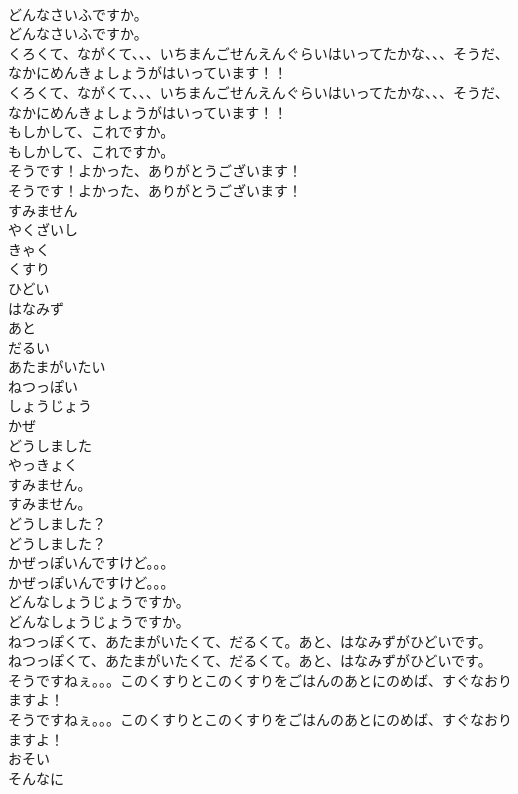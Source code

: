\documentclass[8pt]{extreport}
\begin{document}
\begin{CJK}{UTF8}{min}
\\	どんなさいふですか。	
\\	どんなさいふですか。 
\\	くろくて、ながくて、、、いちまんごせんえんぐらいはいってたかな、、、そうだ、なかにめんきょしょうがはいっています！！	
\\	くろくて、ながくて、、、いちまんごせんえんぐらいはいってたかな、、、そうだ、なかにめんきょしょうがはいっています！！ 
\\	もしかして、これですか。	
\\	もしかして、これですか。 
\\	そうです！よかった、ありがとうございます！	
\\	そうです！よかった、ありがとうございます！ 
\\	すみません
\\	やくざいし
\\	きゃく
\\	くすり
\\	ひどい
\\	はなみず
\\	あと
\\	だるい
\\	あたまがいたい
\\	ねつっぽい
\\	しょうじょう
\\	かぜ
\\	どうしました
\\	やっきょく
\\	すみません。	
\\	すみません。 
\\	どうしました？	
\\	どうしました？ 
\\	かぜっぽいんですけど。。。	
\\	かぜっぽいんですけど。。。 
\\	どんなしょうじょうですか。	
\\	どんなしょうじょうですか。 
\\	ねつっぽくて、あたまがいたくて、だるくて。あと、はなみずがひどいです。	
\\	ねつっぽくて、あたまがいたくて、だるくて。あと、はなみずがひどいです。 
\\	そうですねぇ。。。このくすりとこのくすりをごはんのあとにのめば、すぐなおりますよ！	
\\	そうですねぇ。。。このくすりとこのくすりをごはんのあとにのめば、すぐなおりますよ！ 
\\	おそい
\\	そんなに

\end{CJK}
\end{document}
